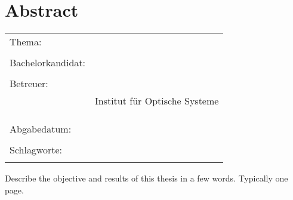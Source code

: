 \thispagestyle{plain}
\chapter*{Abstract}
\label{ch:abstract}

\bigskip

\begin{center}
	\begin{tabular}{p{3.2cm}p{9.6cm}}
		Thema: & \thema \\
		 & \\
		Bachelorkandidat: & \autor \\
		 & \\
		Betreuer: & \prueferA \\[.5ex]
		 & Institut für Optische Systeme\\[3ex]
		 & \prueferB \\[.5ex]
		 & \firma \\
		 & \\
		Abgabedatum: & \abgabedatum \\
		 & \\
		Schlagworte: & \schlagworte \\
		 & \\
	\end{tabular}
\end{center}

\bigskip

\noindent

Describe the objective and results of this thesis in a few words.
Typically one page.

\newpage
